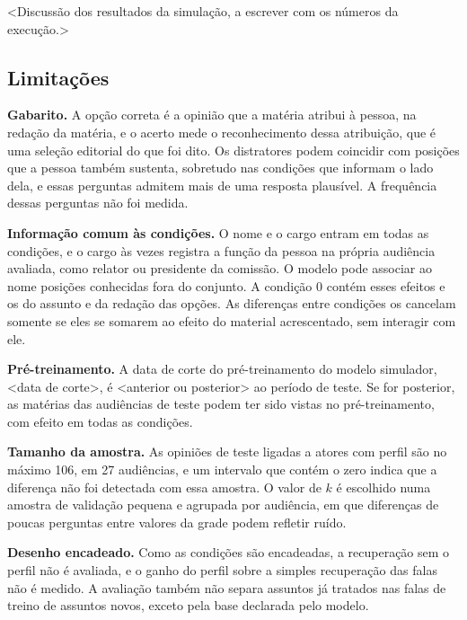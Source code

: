 <Discussão dos resultados da simulação, a escrever com os números da execução.>


\subsection{Limitações}
\label{sec:limitacoes}

\textbf{Gabarito.} A opção correta é a opinião que a matéria atribui à pessoa, na redação da
matéria, e o acerto mede o reconhecimento dessa atribuição, que é uma seleção editorial do que foi
dito. Os distratores podem coincidir com posições que a pessoa também sustenta, sobretudo nas
condições que informam o lado dela, e essas perguntas admitem mais de uma resposta plausível. A
frequência dessas perguntas não foi medida.

\textbf{Informação comum às condições.} O nome e o cargo entram em todas as condições, e o cargo às
vezes registra a função da pessoa na própria audiência avaliada, como relator ou presidente da
comissão. O modelo pode associar ao nome posições conhecidas fora do conjunto. A condição 0 contém
esses efeitos e os do assunto e da redação das opções. As diferenças entre condições os cancelam
somente se eles se somarem ao efeito do material acrescentado, sem interagir com ele.

\textbf{Pré-treinamento.} A data de corte do pré-treinamento do modelo simulador, <data de corte>, é
<anterior ou posterior> ao período de teste. Se for posterior, as matérias das audiências de teste
podem ter sido vistas no pré-treinamento, com efeito em todas as condições.

\textbf{Tamanho da amostra.} As opiniões de teste ligadas a atores com perfil são no máximo 106, em
27 audiências, e um intervalo que contém o zero indica que a diferença não foi detectada com essa
amostra. O valor de $k$ é escolhido numa amostra de validação pequena e agrupada por audiência, em
que diferenças de poucas perguntas entre valores da grade podem refletir ruído.

\textbf{Desenho encadeado.} Como as condições são encadeadas, a recuperação sem o perfil não é
avaliada, e o ganho do perfil sobre a simples recuperação das falas não é medido. A avaliação
também não separa assuntos já tratados nas falas de treino de assuntos novos, exceto pela base
declarada pelo modelo.


